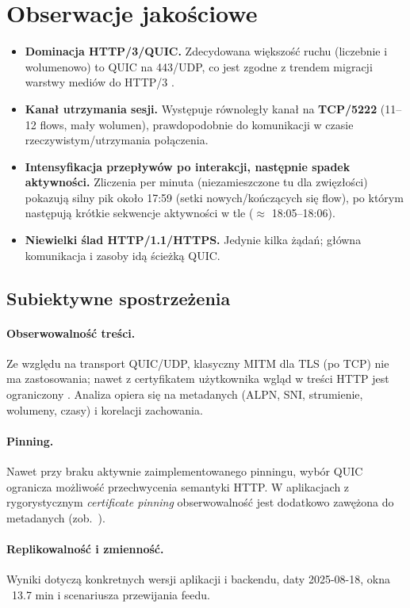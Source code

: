 \section{Obserwacje jakościowe}
\begin{itemize}
  \item \textbf{Dominacja HTTP/3/QUIC.} Zdecydowana większość ruchu (liczebnie i wolumenowo) to QUIC na 443/UDP, co jest zgodne z trendem migracji warstwy mediów do HTTP/3 \cite{RFC9114,RFC9000}.
  \item \textbf{Kanał utrzymania sesji.} Występuje równoległy kanał na \textbf{TCP/5222} (11--12 flows, mały wolumen), prawdopodobnie do komunikacji w czasie rzeczywistym/utrzymania połączenia.
  \item \textbf{Intensyfikacja przepływów po interakcji, następnie spadek aktywności.} Zliczenia per minuta (niezamieszczone tu dla zwięzłości) pokazują silny pik około 17{:}59 (setki nowych/kończących się flow), po którym następują krótkie sekwencje aktywności w tle ($\approx$ 18{:}05–18{:}06).
  \item \textbf{Niewielki ślad HTTP/1.1/HTTPS.} Jedynie kilka żądań; główna komunikacja i zasoby idą ścieżką QUIC.
\end{itemize}

\subsection{Subiektywne spostrzeżenia}
\paragraph{Obserwowalność treści.}
Ze względu na transport QUIC/UDP, klasyczny MITM dla TLS (po TCP) nie ma zastosowania; nawet z certyfikatem użytkownika wgląd w treści HTTP jest ograniczony \cite{RFC9114}. Analiza opiera się na metadanych (ALPN, SNI, strumienie, wolumeny, czasy) i korelacji zachowania.
\paragraph{Pinning.}
Nawet przy braku aktywnie zaimplementowanego pinningu, wybór QUIC ogranicza możliwość przechwycenia semantyki HTTP. W aplikacjach z rygorystycznym \emph{certificate pinning} obserwowalność jest dodatkowo zawężona do metadanych (zob.\ \cite{OWASPMASTGPinning}).
\paragraph{Replikowalność i zmienność.}
Wyniki dotyczą konkretnych wersji aplikacji i backendu, daty 2025-08-18, okna ~13.7 min i scenariusza przewijania feedu.

